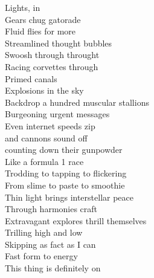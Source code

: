 Lights, in\\
Gears chug gatorade\\
Fluid flies for more\\
Streamlined thought bubbles\\
Swoosh through throught\\
Racing corvettes through\\
Primed canals\\
Explosions in the sky\\
Backdrop a hundred muscular stallions\\
Burgeoning urgent messages\\
Even internet speeds zip\\
and cannons sound off\\
counting down their gunpowder\\
Like a formula 1 race\\
Trodding to tapping to flickering\\
From slime to paste to smoothie\\
Thin light brings interstellar peace\\
Through harmonies craft\\
Extravagant explores thrill themselves\\
Trilling high and low\\
Skipping as fact as I can\\
Fast form to energy\\
This thing is definitely on\\

